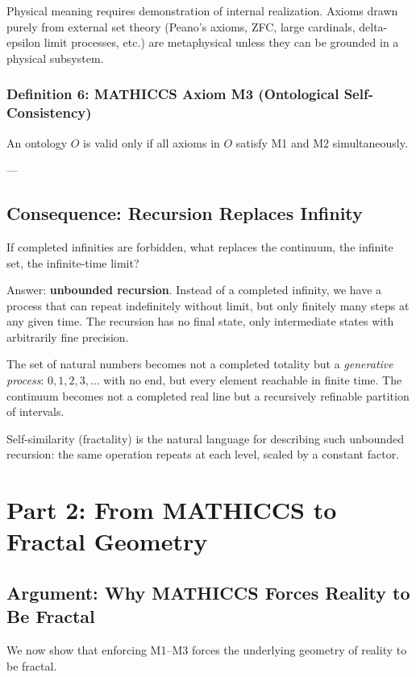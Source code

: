 \documentclass[11pt,a4paper]{article}
\begin{document}
Physical meaning requires demonstration of internal realization. Axioms drawn purely from external set theory (Peano's axioms, ZFC, large cardinals, delta-epsilon limit processes, etc.) are metaphysical unless they can be grounded in a physical subsystem.

\subsubsection{Definition 6: MATHICCS Axiom M3 (Ontological Self-Consistency)}

An ontology $O$ is valid only if all axioms in $O$ satisfy M1 and M2 simultaneously.

---

\subsection{Consequence: Recursion Replaces Infinity}

If completed infinities are forbidden, what replaces the continuum, the infinite set, the infinite-time limit?

Answer: \textbf{unbounded recursion}. Instead of a completed infinity, we have a process that can repeat indefinitely without limit, but only finitely many steps at any given time. The recursion has no final state, only intermediate states with arbitrarily fine precision.

The set of natural numbers becomes not a completed totality but a \textit{generative process}: $0, 1, 2, 3, \ldots$ with no end, but every element reachable in finite time. The continuum becomes not a completed real line but a recursively refinable partition of intervals.

Self-similarity (fractality) is the natural language for describing such unbounded recursion: the same operation repeats at each level, scaled by a constant factor.

\section{Part 2: From MATHICCS to Fractal Geometry}

\subsection{Argument: Why MATHICCS Forces Reality to Be Fractal}

We now show that enforcing M1--M3 forces the underlying geometry of reality to be fractal.
\end{document}
